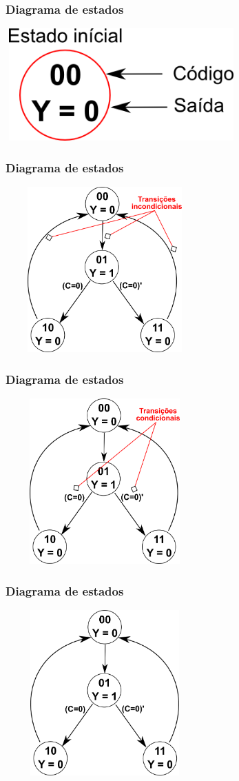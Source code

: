 \documentclass{beamer}
\begin{document}
\begin{frame}
  \frametitle{Diagrama de estados}
  \includegraphics[height = 1.7in, width = 3.5in]{images/mealyvsmoore.png}
\end{frame}

\begin{frame}
  \frametitle{Diagrama de estados}
  \includegraphics[height = 2.5in, width = 3in]{images/mealyvsmoore_2.png}
\end{frame}

\begin{frame}
  \frametitle{Diagrama de estados}
  \includegraphics[height = 2.5in, width = 3in]{images/mealyvsmoore_3.png}
\end{frame}

\begin{frame}
  \frametitle{Diagrama de estados}
  \includegraphics[height = 2.5in, width = 3in]{images/mealyvsmoore_4.png}
\end{frame}
\end{document}
